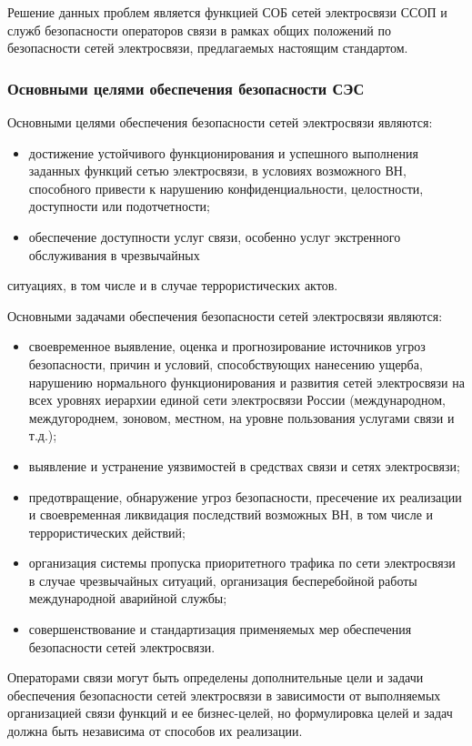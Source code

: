 \documentclass[12pt, russian, oneside, article]{ncc}
\begin{document}
Решение данных проблем является функцией СОБ сетей электросвязи ССОП и служб безопасности операторов связи в рамках общих положений по безопасности сетей электросвязи, предлагаемых настоящим стандартом.
\subsubsection{Основными целями обеспечения безопасности СЭС}
\label{sec-1_1_3}


Основными целями обеспечения безопасности сетей электросвязи являются:
\begin{itemize}
\item достижение устойчивого функционирования и успешного выполнения заданных функций сетью электросвязи, в условиях возможного ВН, способного привести  к нарушению конфиденциальности, целостности, доступности или подотчетности;
\item обеспечение доступности услуг связи, особенно услуг экстренного обслуживания в чрезвычайных
\end{itemize}
ситуациях, в том числе и в случае террористических актов.

Основными задачами обеспечения безопасности сетей электросвязи являются:
\begin{itemize}
\item своевременное выявление, оценка и прогнозирование источников угроз безопасности, причин и условий, способствующих нанесению ущерба, нарушению нормального функционирования и развития сетей электросвязи на всех уровнях иерархии единой сети электросвязи России (международном, междугороднем, зоновом, местном, на уровне пользования услугами связи и т.д.);
\item выявление и устранение уязвимостей в средствах связи и сетях электросвязи;
\item предотвращение, обнаружение угроз безопасности, пресечение их реализации и своевременная ликвидация последствий возможных ВН, в том числе и террористических действий;
\item организация системы пропуска приоритетного трафика по сети электросвязи в случае чрезвычайных ситуаций, организация бесперебойной работы международной аварийной службы;
\item совершенствование и стандартизация применяемых мер обеспечения безопасности сетей электросвязи.
\end{itemize}

Операторами связи могут быть определены дополнительные цели и задачи обеспечения безопасности сетей электросвязи в зависимости от выполняемых организацией связи функций и ее бизнес-целей, но формулировка целей и задач должна быть независима от способов их реализации.
\end{document}
